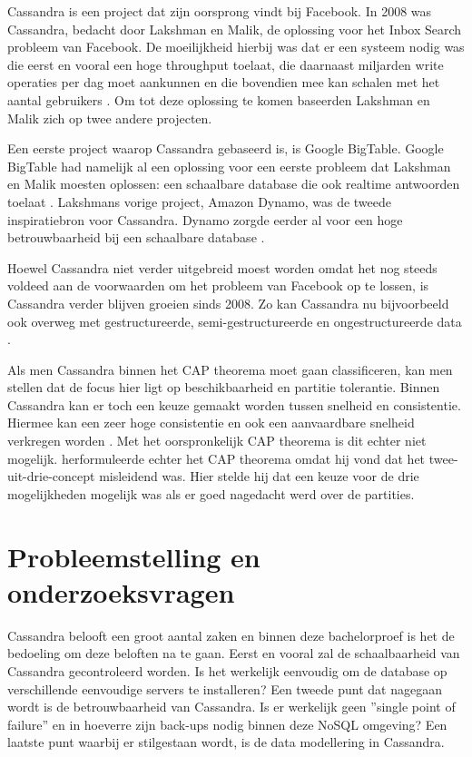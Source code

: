 Cassandra is een project dat zijn oorsprong vindt bij Facebook.
In 2008 was Cassandra, bedacht door Lakshman en Malik, de oplossing voor het Inbox Search probleem van Facebook.
De moeilijkheid hierbij was dat er een systeem nodig was die eerst en vooral een hoge throughput toelaat, die daarnaast miljarden write operaties per dag moet aankunnen en die bovendien mee kan schalen met het aantal gebruikers \citep{lakshman2010cassandra}.
Om tot deze oplossing te komen baseerden Lakshman en Malik zich op twee andere projecten.

Een eerste project waarop Cassandra gebaseerd is, is Google BigTable.
Google BigTable had namelijk al een oplossing voor een eerste probleem dat Lakshman en Malik moesten oplossen: een schaalbare database die ook realtime antwoorden toelaat \citep{chang2008bigtable}.
Lakshmans vorige project, Amazon Dynamo, was de tweede inspiratiebron voor Cassandra.
Dynamo zorgde eerder al voor een hoge betrouwbaarheid bij een schaalbare database \citep{decandia2007dynamo}.

Hoewel Cassandra niet verder uitgebreid moest worden omdat het nog steeds voldeed aan de voorwaarden om het probleem van Facebook op te lossen, is Cassandra verder blijven groeien sinds 2008.
Zo kan Cassandra nu bijvoorbeeld ook overweg met gestructureerde, semi-gestructureerde en ongestructureerde data \citep{kan2014cassandra}.

Als men Cassandra binnen het CAP theorema moet gaan classificeren, kan men stellen dat de focus hier ligt op beschikbaarheid en partitie tolerantie.
Binnen Cassandra kan er toch een keuze gemaakt worden tussen snelheid en consistentie.
Hiermee kan een zeer hoge consistentie en ook een aanvaardbare snelheid verkregen worden \citep{ellis2009cassandra}.
Met het oorspronkelijk CAP theorema is dit echter niet mogelijk.
\cite{brewer2012cap} herformuleerde echter het CAP theorema omdat hij vond dat het twee-uit-drie-concept misleidend was.
Hier stelde hij dat een keuze voor de drie mogelijkheden mogelijk was als er goed nagedacht werd over de partities.

\section{Probleemstelling en onderzoeksvragen}
\label{sec:onderzoeksvragen}


Cassandra belooft een groot aantal zaken en binnen deze bachelorproef is het de bedoeling om deze beloften na te gaan.
Eerst en vooral zal de schaalbaarheid van Cassandra gecontroleerd worden.
Is het werkelijk eenvoudig om de database op verschillende eenvoudige servers te installeren?
Een tweede punt dat nagegaan wordt is de betrouwbaarheid van Cassandra.
Is er werkelijk geen ''single point of failure'' en in hoeverre zijn back-ups nodig binnen deze NoSQL omgeving?
Een laatste punt waarbij er stilgestaan wordt, is de data modellering in Cassandra.